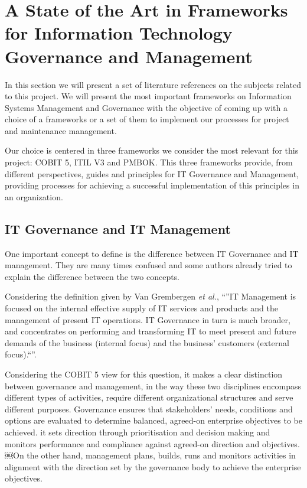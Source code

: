 
% 
% 


\section{A State of the Art in Frameworks for Information Technology Governance and Management}

In this section we will present a set of literature references on the subjects related to this project. We will present the most important frameworks on Information Systems Management and Governance with the objective of coming up with a choice of a frameworks or a set of them to implement our processes for project and maintenance management.\par
Our choice is centered in three frameworks we consider the most relevant for this project: COBIT 5, ITIL V3 and PMBOK. This three frameworks provide, from different perspectives, guides and principles for IT Governance and Management, providing processes for achieving a successful implementation of this principles in an organization.

\subsection{IT Governance and IT Management}

One important concept to define is the difference between IT Governance and IT management. They are many times confused and some authors already tried to explain the difference between the two concepts.\par
Considering the definition given by Van Grembergen \textit{et al.}, ``''IT Management is focused on the internal effective supply of IT services and products and the management of present IT operations. IT Governance in turn is much broader, and concentrates on performing and transforming IT to meet present and future demands of the business (internal focus) and the business' customers (external focus).``''.\par
 Considering the COBIT 5 view for this question, it makes a clear distinction between governance and management, in the way these two disciplines encompass different types of activities, require different organizational structures and serve different purposes. Governance ensures that stakeholders' needs, conditions and options are evaluated to determine balanced, agreed-on enterprise objectives to be achieved. it sets direction through prioritisation and decision making and monitors performance and compliance against agreed-on direction and objectives.￼On the other hand, management plans, builds, runs and monitors activities in alignment with the direction set by the governance body to achieve the enterprise objectives.\par

